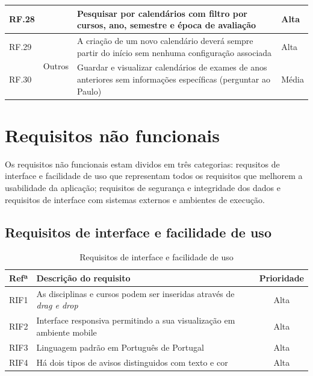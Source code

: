 \documentclass[11pt, twoside]{report}
\begin{document}
\begin{center}
\begin{longtable}{|m{1cm}|m{2.2cm}|m{10cm}|m{2cm}|}
			RF.28  && Pesquisar por calendários com filtro por cursos, ano, semestre e época de avaliação  & Alta \\
			\hline
			
			RF.29 &\multirow{2}{*}{Outros}& A criação de um novo calendário deverá sempre partir do início sem nenhuma configuração associada & Alta\\
		
			RF.30 && Guardar e visualizar calendários de exames de anos anteriores sem informações específicas (perguntar ao Paulo) & Média \\
			\hline
		\end{longtable}
	\end{center}



	
	\section{Requisitos não funcionais}
	
	Os requisitos não funcionais estam dividos em três categorias: requsitos de interface e facilidade de uso que representam todos os requisitos que melhorem a usabilidade da aplicação; requisitos de segurança e integridade dos dados e requisitos de interface com sistemas externos e ambientes de execução.
	
	\subsection{Requisitos de interface e facilidade de uso}

	
	\begin{table}[H]
	\caption{Requisitos de interface e facilidade de uso}
	
	\begin{center}
		\begin{tabularx}{\textwidth}{|c|X|c|}
			\hline
			\textbf{Refª }	& \textbf{Descrição do requisito} & \textbf{Prioridade} \\
			\hline
			RIF1 & As disciplinas e cursos podem ser inseridas através de \textit{drag e drop} &Alta\\
			\hline
			RIF2 & Interface responsiva permitindo a sua visualização em ambiente mobile &Alta\\
			\hline
			RIF3 & Linguagem padrão em Português de Portugal &Alta\\
			\hline
			RIF4 & Há dois tipos de avisos distinguidos com texto e cor &Alta\\
			\hline
		\end{tabularx}
		\label{requisitosdeinterface}
	\end{center}
	\end{table}
\end{document}
